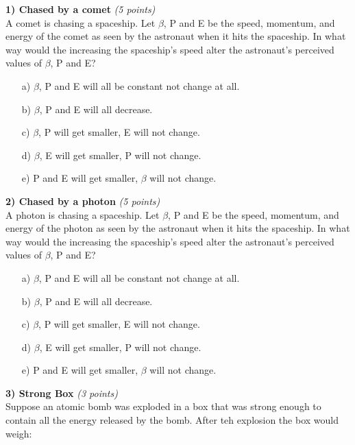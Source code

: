 {\large


\textbf{1) Chased by a comet }\hfill \textit{(5 points)}\\
A comet is chasing a spaceship.
Let $\beta$, P and E be the speed, momentum, and energy of the comet as seen by the astronaut when it hits the spaceship. 
In what way would the increasing the spaceship's speed alter the astronaut's perceived values of $\beta$, P and E?

\begin{itemize}
\item[a)] $\beta$, P and E will all be constant not change at all.
\item[b)] $\beta$, P and E will all decrease.
\item[c)] $\beta$, P will get smaller, E will not change.
\item[d)] $\beta$, E will get smaller, P will not change.
\item[e)] P and E will get smaller, $\beta$ will not change.
\end{itemize}

\vspace{0.5in}

\textbf{2) Chased by a photon }\hfill \textit{(5 points)}\\
A photon is chasing a spaceship.
Let $\beta$, P and E be the speed, momentum, and energy of the photon as seen by the astronaut when it hits the spaceship. 
In what way would the increasing the spaceship's speed alter the astronaut's perceived values of $\beta$, P and E?

\begin{itemize}
\item[a)] $\beta$, P and E will all be constant not change at all.
\item[b)] $\beta$, P and E will all decrease.
\item[c)] $\beta$, P will get smaller, E will not change.
\item[d)] $\beta$, E will get smaller, P will not change.
\item[e)] P and E will get smaller, $\beta$ will not change.
\end{itemize}

\vspace{0.5in}

\textbf{3) Strong Box }\hfill \textit{(3 points)}\\
Suppose an atomic bomb was exploded in a box that was strong enough to contain all the energy released by the bomb.
After teh explosion the box would weigh:

}
